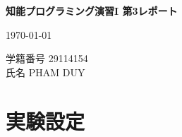 \documentclass{jarticle}
\begin{document}

\begin{center} 
{\large \bf 知能プログラミング演習I 第3レポート}
\end{center} %
\begin{flushright}
  \today
\end{flushright}
\begin{flushright}
\hskip 1mm
学籍番号 %
29114154 \\
\hskip 1mm
氏名 %
PHAM DUY
\end{flushright} %

\section{実験設定}
\end{document}
